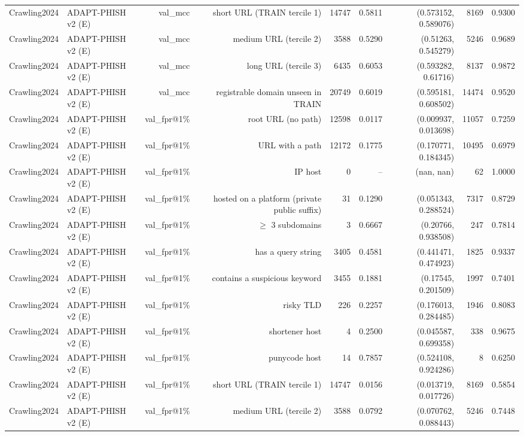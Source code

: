 \begin{table}[t]
\begin{tabular}{llrrrrrrr}
Crawling2024 & ADAPT-PHISH v2 (E) & val\_mcc & short URL (TRAIN tercile 1) & 14747 & 0.5811 & (0.573152, 0.589076) & 8169 & 0.9300 \\
Crawling2024 & ADAPT-PHISH v2 (E) & val\_mcc & medium URL (tercile 2) & 3588 & 0.5290 & (0.51263, 0.545279) & 5246 & 0.9689 \\
Crawling2024 & ADAPT-PHISH v2 (E) & val\_mcc & long URL (tercile 3) & 6435 & 0.6053 & (0.593282, 0.61716) & 8137 & 0.9872 \\
Crawling2024 & ADAPT-PHISH v2 (E) & val\_mcc & registrable domain unseen in TRAIN & 20749 & 0.6019 & (0.595181, 0.608502) & 14474 & 0.9520 \\
Crawling2024 & ADAPT-PHISH v2 (E) & val\_fpr@1\% & root URL (no path) & 12598 & 0.0117 & (0.009937, 0.013698) & 11057 & 0.7259 \\
Crawling2024 & ADAPT-PHISH v2 (E) & val\_fpr@1\% & URL with a path & 12172 & 0.1775 & (0.170771, 0.184345) & 10495 & 0.6979 \\
Crawling2024 & ADAPT-PHISH v2 (E) & val\_fpr@1\% & IP host & 0 & -- & (nan, nan) & 62 & 1.0000 \\
Crawling2024 & ADAPT-PHISH v2 (E) & val\_fpr@1\% & hosted on a platform (private public suffix) & 31 & 0.1290 & (0.051343, 0.288524) & 7317 & 0.8729 \\
Crawling2024 & ADAPT-PHISH v2 (E) & val\_fpr@1\% & $\geq$ 3 subdomains & 3 & 0.6667 & (0.20766, 0.938508) & 247 & 0.7814 \\
Crawling2024 & ADAPT-PHISH v2 (E) & val\_fpr@1\% & has a query string & 3405 & 0.4581 & (0.441471, 0.474923) & 1825 & 0.9337 \\
Crawling2024 & ADAPT-PHISH v2 (E) & val\_fpr@1\% & contains a suspicious keyword & 3455 & 0.1881 & (0.17545, 0.201509) & 1997 & 0.7401 \\
Crawling2024 & ADAPT-PHISH v2 (E) & val\_fpr@1\% & risky TLD & 226 & 0.2257 & (0.176013, 0.284485) & 1946 & 0.8083 \\
Crawling2024 & ADAPT-PHISH v2 (E) & val\_fpr@1\% & shortener host & 4 & 0.2500 & (0.045587, 0.699358) & 338 & 0.9675 \\
Crawling2024 & ADAPT-PHISH v2 (E) & val\_fpr@1\% & punycode host & 14 & 0.7857 & (0.524108, 0.924286) & 8 & 0.6250 \\
Crawling2024 & ADAPT-PHISH v2 (E) & val\_fpr@1\% & short URL (TRAIN tercile 1) & 14747 & 0.0156 & (0.013719, 0.017726) & 8169 & 0.5854 \\
Crawling2024 & ADAPT-PHISH v2 (E) & val\_fpr@1\% & medium URL (tercile 2) & 3588 & 0.0792 & (0.070762, 0.088443) & 5246 & 0.7448 \\

\end{tabular}
\end{table}
